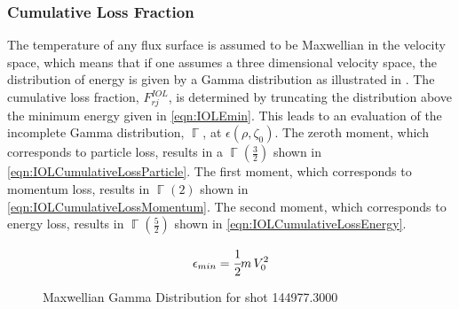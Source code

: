 \subsubsection{Cumulative Loss Fraction} \label{subsub:CumulativeLoss}

The temperature of any flux surface is assumed to be Maxwellian in the velocity space, which means that if one assumes a three dimensional velocity space, the distribution of energy is given by a Gamma distribution as illustrated in . The cumulative loss fraction, $F_{rj}^{IOL}$, is determined by truncating the distribution above the minimum energy given in \cref{eqn:IOLEmin}. This leads to an evaluation of the incomplete Gamma distribution, $\BbbGamma$, at $\epsilon\left(\rho,\zeta_0\right)$. The zeroth moment, which corresponds to particle loss, results in a $\BbbGamma\left(\frac{3}{2}\right)$ shown in \cref{eqn:IOLCumulativeLossParticle}. The first moment, which corresponds to momentum loss, results in $\BbbGamma\left(2\right)$ shown in \cref{eqn:IOLCumulativeLossMomentum}. The second moment, which corresponds to energy loss, results in $\BbbGamma\left(\frac{5}{2}\right)$ shown in \cref{eqn:IOLCumulativeLossEnergy}.

\begin{equation}
	\epsilon_{min} = \cfrac{1}{2} m \, V_0^2
	\label{eqn:IOLEmin}
\end{equation}

\begin{figure}[!hb]
	 \quad
	\caption{Maxwellian Gamma Distribution for shot 144977.3000}
\end{figure}

